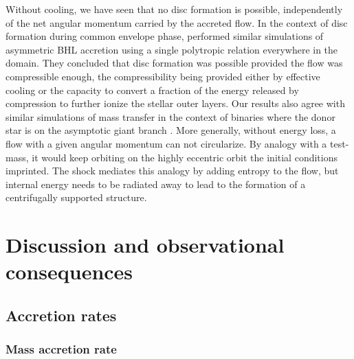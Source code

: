 \documentclass{aa}
\begin{document}
Without cooling, we have seen that no disc formation is possible, independently of the net angular momentum carried by the accreted flow. In the context of disc formation during common envelope phase, \cite{MacLeod2015,MacLeod2017,Murguia-Berthier2017} performed similar simulations of asymmetric BHL accretion using a single polytropic relation everywhere in the domain. They concluded that disc formation was possible provided the flow was compressible enough, the compressibility being provided either by effective cooling or the capacity to convert a fraction of the energy released by compression to further ionize the stellar outer layers. Our results also agree with similar simulations of mass transfer in the context of binaries where the donor star is on the asymptotic giant branch \citep{HuarteEspinosa:2012wq,Saladino2018}. More generally, without energy loss, a flow with a given angular momentum can not circularize. By analogy with a test-mass, it would keep orbiting on the highly eccentric orbit the initial conditions imprinted. The shock mediates this analogy by adding entropy to the flow, but internal energy needs to be radiated away to lead to the formation of a centrifugally supported structure.

%
%

\section{Discussion and observational consequences}
\label{sec:obs_cons}

\subsection{Accretion rates}
\label{sec:mdot_ldot}

\subsubsection{Mass accretion rate}
\label{sec:mdot}
\end{document}
